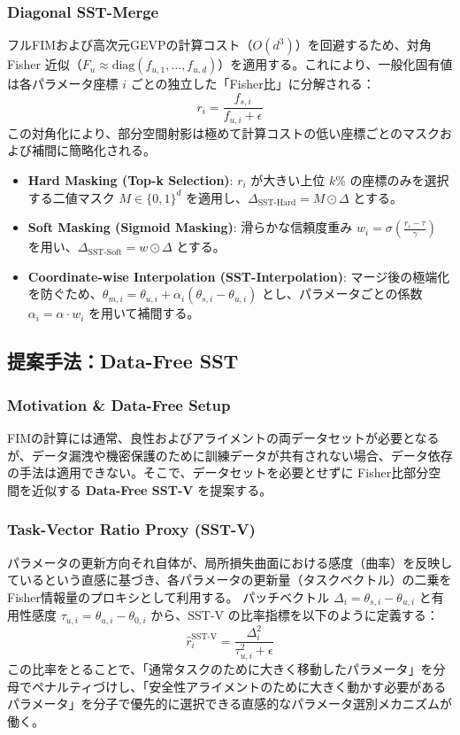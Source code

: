 \documentclass{article}
\begin{document}
\subsubsection{Diagonal SST-Merge}
フルFIMおよび高次元GEVPの計算コスト（$O(d^3)$）を回避するため、対角 Fisher 近似（$F_u \approx \text{diag}(f_{u,1}, \dots, f_{u,d})$）を適用する。これにより、一般化固有値は各パラメータ座標 $i$ ごとの独立した「Fisher比」に分解される：
\[ r_i = \frac{f_{s,i}}{f_{u,i} + \epsilon} \]
この対角化により、部分空間射影は極めて計算コストの低い座標ごとのマスクおよび補間に簡略化される。
\begin{itemize}
    \item \textbf{Hard Masking (Top-k Selection)}: $r_i$ が大きい上位 $k$\% の座標のみを選択する二値マスク $M \in \{0, 1\}^d$ を適用し、$\Delta_{\text{SST-Hard}} = M \odot \Delta$ とする。
    \item \textbf{Soft Masking (Sigmoid Masking)}: 滑らかな信頼度重み $w_i = \sigma\left(\frac{r_i - \tau}{\gamma}\right)$ を用い、$\Delta_{\text{SST-Soft}} = w \odot \Delta$ とする。
    \item \textbf{Coordinate-wise Interpolation (SST-Interpolation)}: マージ後の極端化を防ぐため、$\theta_{m,i} = \theta_{u,i} + \alpha_i (\theta_{s,i} - \theta_{u,i})$ とし、パラメータごとの係数 $\alpha_i = \alpha \cdot w_i$ を用いて補間する。
\end{itemize}

\subsection{提案手法：Data-Free SST}

\subsubsection{Motivation \& Data-Free Setup}
FIMの計算には通常、良性およびアライメントの両データセットが必要となるが、データ漏洩や機密保護のために訓練データが共有されない場合、データ依存の手法は適用できない。そこで、データセットを必要とせずに Fisher比部分空間を近似する \textbf{Data-Free SST-V} を提案する。

\subsubsection{Task-Vector Ratio Proxy (SST-V)}
パラメータの更新方向それ自体が、局所損失曲面における感度（曲率）を反映しているという直感に基づき、各パラメータの更新量（タスクベクトル）の二乗を Fisher情報量のプロキシとして利用する。
パッチベクトル $\Delta_i = \theta_{s,i} - \theta_{u,i}$ と有用性感度 $\tau_{u,i} = \theta_{u,i} - \theta_{0,i}$ から、SST-V の比率指標を以下のように定義する：
\[ \hat{r}_i^{\text{SST-V}} = \frac{\Delta_i^2}{\tau_{u,i}^2 + \epsilon} \]
この比率をとることで、「通常タスクのために大きく移動したパラメータ」を分母でペナルティづけし、「安全性アライメントのために大きく動かす必要があるパラメータ」を分子で優先的に選択できる直感的なパラメータ選別メカニズムが働く。
\end{document}
